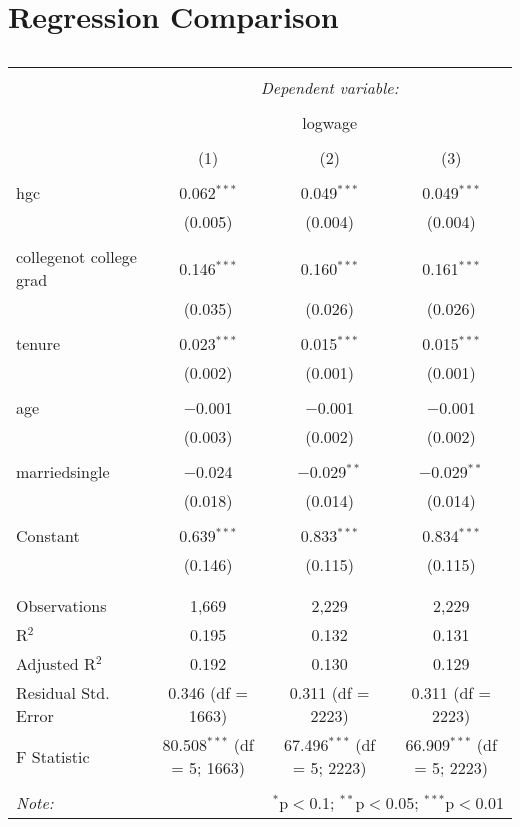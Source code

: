 \documentclass{article}
\begin{document}
\section{Regression Comparison}
\begin{table}[!htbp] \centering 
  \caption{} 
  \label{} 
\begin{tabular}{@{\extracolsep{5pt}}lccc} 
\\[-1.8ex]\hline 
\hline \\[-1.8ex] 
 & \multicolumn{3}{c}{\textit{Dependent variable:}} \\ 
\cline{2-4} 
\\[-1.8ex] & \multicolumn{3}{c}{logwage} \\ 
\\[-1.8ex] & (1) & (2) & (3)\\ 
\hline \\[-1.8ex] 
 hgc & 0.062$^{***}$ & 0.049$^{***}$ & 0.049$^{***}$ \\ 
  & (0.005) & (0.004) & (0.004) \\ 
  & & & \\ 
 collegenot college grad & 0.146$^{***}$ & 0.160$^{***}$ & 0.161$^{***}$ \\ 
  & (0.035) & (0.026) & (0.026) \\ 
  & & & \\ 
 tenure & 0.023$^{***}$ & 0.015$^{***}$ & 0.015$^{***}$ \\ 
  & (0.002) & (0.001) & (0.001) \\ 
  & & & \\ 
 age & $-$0.001 & $-$0.001 & $-$0.001 \\ 
  & (0.003) & (0.002) & (0.002) \\ 
  & & & \\ 
 marriedsingle & $-$0.024 & $-$0.029$^{**}$ & $-$0.029$^{**}$ \\ 
  & (0.018) & (0.014) & (0.014) \\ 
  & & & \\ 
 Constant & 0.639$^{***}$ & 0.833$^{***}$ & 0.834$^{***}$ \\ 
  & (0.146) & (0.115) & (0.115) \\ 
  & & & \\ 
\hline \\[-1.8ex] 
Observations & 1,669 & 2,229 & 2,229 \\ 
R$^{2}$ & 0.195 & 0.132 & 0.131 \\ 
Adjusted R$^{2}$ & 0.192 & 0.130 & 0.129 \\ 
Residual Std. Error & 0.346 (df = 1663) & 0.311 (df = 2223) & 0.311 (df = 2223) \\ 
F Statistic & 80.508$^{***}$ (df = 5; 1663) & 67.496$^{***}$ (df = 5; 2223) & 66.909$^{***}$ (df = 5; 2223) \\ 
\hline 
\hline \\[-1.8ex] 
\textit{Note:}  & \multicolumn{3}{r}{$^{*}$p$<$0.1; $^{**}$p$<$0.05; $^{***}$p$<$0.01} \\ 
\end{tabular} 
\end{table}
\end{document}

